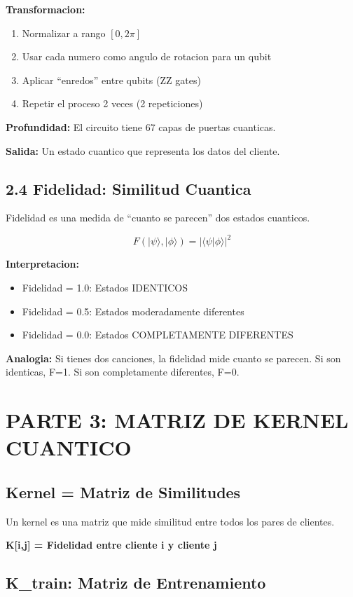 \documentclass[11pt]{article}
\begin{document}
\textbf{Transformacion:}
\begin{enumerate}
\item Normalizar a rango $[0, 2\pi]$
\item Usar cada numero como angulo de rotacion para un qubit
\item Aplicar ``enredos'' entre qubits (ZZ gates)
\item Repetir el proceso 2 veces (2 repeticiones)
\end{enumerate}

\textbf{Profundidad:} El circuito tiene 67 capas de puertas cuanticas.

\textbf{Salida:} Un estado cuantico que representa los datos del cliente.

\subsection*{2.4 Fidelidad: Similitud Cuantica}

Fidelidad es una medida de ``cuanto se parecen'' dos estados cuanticos.

$$F(|\psi\rangle, |\phi\rangle) = |\langle\psi|\phi\rangle|^2$$

\textbf{Interpretacion:}
\begin{itemize}
\item Fidelidad = 1.0: Estados IDENTICOS
\item Fidelidad = 0.5: Estados moderadamente diferentes
\item Fidelidad = 0.0: Estados COMPLETAMENTE DIFERENTES
\end{itemize}

\textbf{Analogia:} Si tienes dos canciones, la fidelidad mide cuanto se parecen. Si son identicas, F=1. Si son completamente diferentes, F=0.

\section*{PARTE 3: MATRIZ DE KERNEL CUANTICO}

\subsection*{Kernel = Matriz de Similitudes}

Un kernel es una matriz que mide similitud entre todos los pares de clientes.

\textbf{K[i,j] = Fidelidad entre cliente i y cliente j}

\subsection*{K\_train: Matriz de Entrenamiento}
\end{document}
